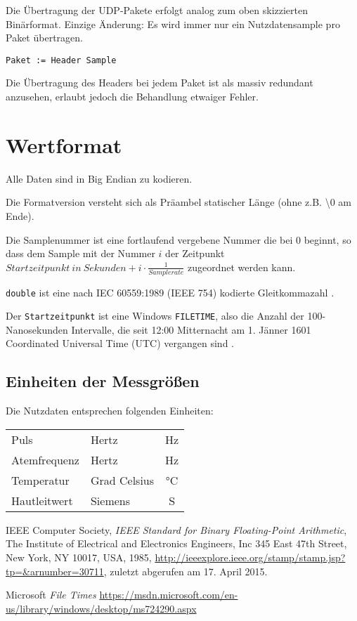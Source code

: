 \documentclass[a4paper,parskip=full,oneside]{scrartcl}
\begin{document}
Die Übertragung der UDP-Pakete erfolgt analog zum oben skizzierten Binärformat.
Einzige Änderung: Es wird immer nur ein Nutzdatensample pro Paket übertragen.

\begin{verbatim}
Paket := Header Sample
\end{verbatim}

Die Übertragung des Headers bei jedem Paket ist als massiv redundant anzusehen,
erlaubt jedoch die Behandlung etwaiger Fehler.

\section{Wertformat}

Alle Daten sind in Big Endian zu kodieren.

Die Formatversion versteht sich als Präambel statischer Länge
(ohne z.B. \textbackslash{}0 am Ende).

Die Samplenummer ist eine fortlaufend vergebene Nummer die bei $0$ beginnt,
so dass dem Sample mit der Nummer $i$ der Zeitpunkt
$\mathit{Startzeitpunkt\ in\ Sekunden} + i \cdot \frac{1}{\mathit{Samplerate}}$
zugeordnet werden kann.

\texttt{double} ist eine nach IEC 60559:1989 (IEEE 754) kodierte Gleitkommazahl \cite{ieee745}.

Der \texttt{Startzeitpunkt} ist eine Windows \texttt{FILETIME},
also die Anzahl der 100-Nanosekunden
Intervalle, die seit 12:00 Mitternacht am 1. Jänner 1601
Coordinated Universal Time (UTC) vergangen sind \cite{filetime}.

\subsection{Einheiten der Messgrößen}
Die Nutzdaten entsprechen folgenden Einheiten:

\begin{tabular}{llc}
Puls & Hertz & Hz \\
Atemfrequenz & Hertz & Hz \\
Temperatur & Grad Celsius & °C \\
Hautleitwert & Siemens & S \\
\end{tabular}

\begin{thebibliography}{9}

  IEEE Computer Society,
  \emph{IEEE Standard for Binary Floating-Point Arithmetic},
  The Institute of Electrical and Electronics Engineers, Inc 345 East 47th Street, New York, NY 10017, USA,
  1985, \url{http://ieeexplore.ieee.org/stamp/stamp.jsp?tp=&arnumber=30711}, zuletzt abgerufen am 17. April 2015.

	Microsoft
	\emph{File Times}
	\url{https://msdn.microsoft.com/en-us/library/windows/desktop/ms724290.aspx}
\end{thebibliography}
\end{document}
